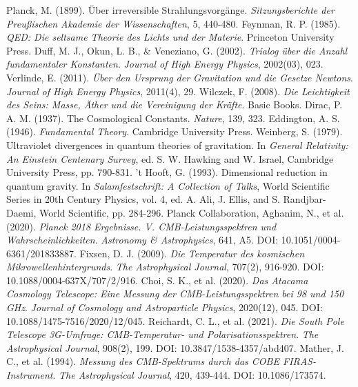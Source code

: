 \documentclass[12pt,a4paper]{article}
\begin{document}
\begin{thebibliography}{99}
		 Planck, M. (1899). Über irreversible Strahlungsvorgänge. \textit{Sitzungsberichte der Preußischen Akademie der Wissenschaften}, 5, 440-480.
		 Feynman, R. P. (1985). \textit{QED: Die seltsame Theorie des Lichts und der Materie}. Princeton University Press.
		 Duff, M. J., Okun, L. B., \& Veneziano, G. (2002). \textit{Trialog über die Anzahl fundamentaler Konstanten}. \textit{Journal of High Energy Physics}, 2002(03), 023.
		 Verlinde, E. (2011). \textit{Über den Ursprung der Gravitation und die Gesetze Newtons}. \textit{Journal of High Energy Physics}, 2011(4), 29.
		 Wilczek, F. (2008). \textit{Die Leichtigkeit des Seins: Masse, Äther und die Vereinigung der Kräfte}. Basic Books.
		 Dirac, P. A. M. (1937). The Cosmological Constants. \textit{Nature}, 139, 323.
		 Eddington, A. S. (1946). \textit{Fundamental Theory}. Cambridge University Press.
		 Weinberg, S. (1979). Ultraviolet divergences in quantum theories of gravitation. In \textit{General Relativity: An Einstein Centenary Survey}, ed. S. W. Hawking and W. Israel, Cambridge University Press, pp. 790-831.
		 't Hooft, G. (1993). Dimensional reduction in quantum gravity. In \textit{Salamfestschrift: A Collection of Talks}, World Scientific Series in 20th Century Physics, vol. 4, ed. A. Ali, J. Ellis, and S. Randjbar-Daemi, World Scientific, pp. 284-296.
		 Planck Collaboration, Aghanim, N., et al. (2020). \textit{Planck 2018 Ergebnisse. V. CMB-Leistungsspektren und Wahrscheinlichkeiten}. \textit{Astronomy \& Astrophysics}, 641, A5. DOI: 10.1051/0004-6361/201833887.
		 Fixsen, D. J. (2009). \textit{Die Temperatur des kosmischen Mikrowellenhintergrunds}. \textit{The Astrophysical Journal}, 707(2), 916-920. DOI: 10.1088/0004-637X/707/2/916.
		 Choi, S. K., et al. (2020). \textit{Das Atacama Cosmology Telescope: Eine Messung der CMB-Leistungsspektren bei 98 und 150 GHz}. \textit{Journal of Cosmology and Astroparticle Physics}, 2020(12), 045. DOI: 10.1088/1475-7516/2020/12/045.
		 Reichardt, C. L., et al. (2021). \textit{Die South Pole Telescope 3G-Umfrage: CMB-Temperatur- und Polarisationsspektren}. \textit{The Astrophysical Journal}, 908(2), 199. DOI: 10.3847/1538-4357/abd407.
		 Mather, J. C., et al. (1994). \textit{Messung des CMB-Spektrums durch das COBE FIRAS-Instrument}. \textit{The Astrophysical Journal}, 420, 439-444. DOI: 10.1086/173574.

\end{thebibliography}
\end{document}
